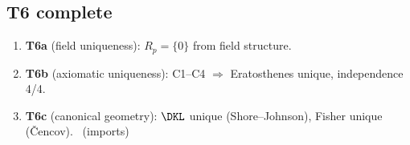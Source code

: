 \documentclass[12pt,a4paper]{article}
\begin{document}
\subsection{T6 complete}
\label{sec:T6_complete}

\begin{theorem}
\label{thm:T6_complete}
\begin{enumerate}[nosep]
\item \textbf{T6a} (field uniqueness): $R_p = \{0\}$ from field structure. \THMTAG
\item \textbf{T6b} (axiomatic uniqueness): C1--C4 $\Rightarrow$ Eratosthenes unique, independence 4/4. \THMTAG
\item \textbf{T6c} (canonical geometry): $\DKL$ unique (Shore--Johnson), Fisher unique (\v{C}encov). \THMTAG~(imports)
\end{enumerate}
\end{theorem}
\end{document}
